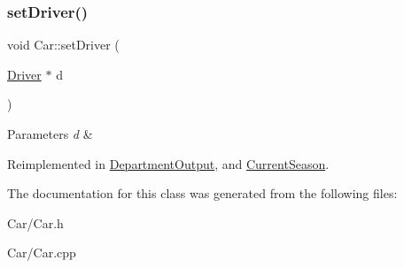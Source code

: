 \subsubsection{\texorpdfstring{set\+Driver()}{setDriver()}}
{\footnotesize\ttfamily void Car\+::set\+Driver (\begin{DoxyParamCaption}\item[{\hyperlink{classDriver}{Driver} $\ast$}]{d }\end{DoxyParamCaption})\hspace{0.3cm}{\ttfamily [virtual]}}


\begin{DoxyParams}{Parameters}
{\em d} & \\
\hline
\end{DoxyParams}


Reimplemented in \hyperlink{classDepartmentOutput_aa045362e5763d57a2c888b98c677773c}{Department\+Output}, and \hyperlink{classCurrentSeason_a3ea9de8713c6d2c21202351b036af75f}{Current\+Season}.



The documentation for this class was generated from the following files\+:\begin{DoxyCompactItemize}
\item 
Car/Car.\+h\item 
Car/Car.\+cpp\end{DoxyCompactItemize}
